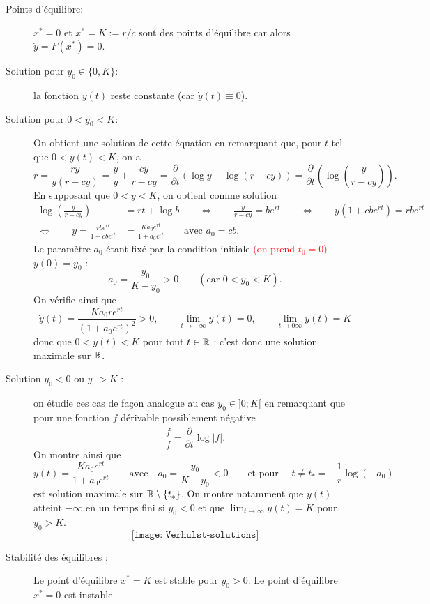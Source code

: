 \begin{description}
  \item[Points d'équilibre:] $x^* = 0$ et $x^* = K := r/c$ sont des points d'équilibre car alors $\dot y = F(x^*) = 0$.
  \item[Solution pour $y_0 \in \{0, K\}$:] la fonction $y(t)$ reste constante (car $\dot y(t) \equiv 0$).
  \item[Solution pour $0 < y_0 < K$:]
  On obtient une solution de cette équation en remarquant que, pour $t$ tel que $0 < y(t) < K$, on a
  $$
  r 
  = \frac{r \dot y}{y(r - cy)}
  = \frac{\dot y}{y} + \frac{c \dot y}{r - cy}
  = \frac{\partial}{\partial t} \left(\log y - \log (r - cy) \right)
  = \frac{\partial}{\partial t} \left(\log \left(\frac{y}{r - cy}\right)\right).
  $$
  En supposant que $0 < y < K$, on obtient comme solution 
  \begin{align*}
    \log \left(\frac{y}{r - cy}\right) & = rt + \log b
    \qquad \Leftrightarrow \qquad 
    \frac{y}{r - cy} = b e^{rt}
    \qquad \Leftrightarrow \qquad
    y(1 + c b e^{rt}) = r b e^{rt} \\
    \Leftrightarrow \qquad 
    y = \frac{rb e^{rt}}{1 + cb e^{rt}} & = \frac{K a_0 e^{rt}}{1 + a_0 e^{rt}}
    \qquad \text{avec } a_0 = cb.
  \end{align*}
  Le paramètre $a_0$ étant fixé par la condition initiale \textcolor{red}{(on prend $t_0 = 0$)} $y(0) = y_0$ : 
  $$
  a_0 = \frac{y_0}{K-y_0} > 0 \qquad (\text{car } 0  < y_0 < K).
  $$
  On vérifie ainsi que 
  $$
  \dot y(t) = \frac{Ka_0 r e^{rt}}{(1 + a_0 e^{rt})^2} > 0, 
  \qquad 
  \lim_{t \rightarrow -\infty} y(t) = 0, 
  \qquad
  \lim_{t \rightarrow 0\infty} y(t) = K
  $$
  donc que $0 < y(t) < K$ pour tout $t \in \mathbb{R}$ : c'est donc une solution maximale sur $\mathbb{R}$. \\
  \item[Solution $y_0 < 0$ ou $y_0 > K$ :] on étudie ces cas de façon analogue au cas $y_0 \in ]0; K[$ en remarquant que pour une fonction $f$ dérivable possiblement négative 
  $$
  \frac{\dot f}{f} = \frac{\partial}{\partial t} \log |f|.
  $$
  On montre ainsi que 
  $$
  y(t) = \frac{K a_ 0 e^{rt}}{1 +  a_0 e^{rt}}
  \qquad \text{avec} \quad a_0 = \frac{y_0}{K-y_0} < 0
  \qquad \text{et pour } \quad t \neq t_* = -\frac1r \log(-a_0)
  $$
  est solution maximale sur $\mathbb{R} \setminus \left\{t_*\right\}$.
  On montre notamment que $y(t)$ atteint $- \infty$ en un temps fini si $y_0 < 0$ et que $\lim_{t \rightarrow \infty} y(t) = K$ pour $y_0 > K$.
  $$
  \texttt{[image: Verhulst-solutions]}
  $$
  \item[Stabilité des équilibres :]
  Le point d'équilibre $x^* = K$ est stable pour $y_0 > 0$. Le point d'équilibre $x^* = 0$ est instable.
\end{description}

